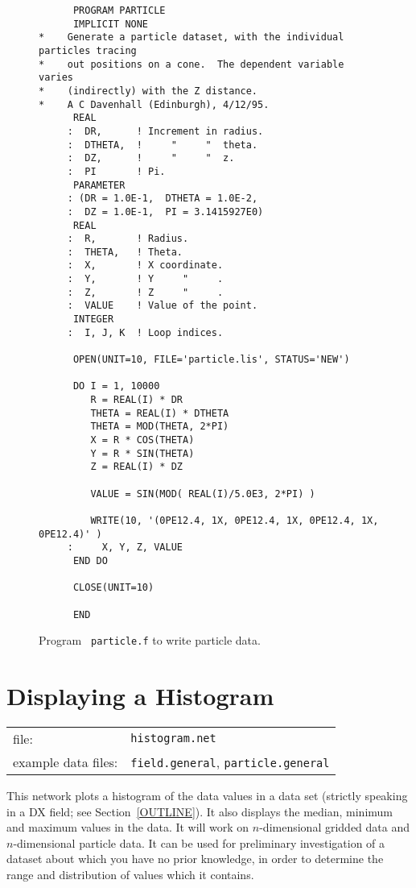 \begin{figure}[htbp]

\begin{verbatim}
      PROGRAM PARTICLE
      IMPLICIT NONE
*    Generate a particle dataset, with the individual particles tracing
*    out positions on a cone.  The dependent variable varies
*    (indirectly) with the Z distance.
*    A C Davenhall (Edinburgh), 4/12/95.
      REAL
     :  DR,      ! Increment in radius.
     :  DTHETA,  !     "     "  theta.
     :  DZ,      !     "     "  z.
     :  PI       ! Pi.
      PARAMETER
     : (DR = 1.0E-1,  DTHETA = 1.0E-2, 
     :  DZ = 1.0E-1,  PI = 3.1415927E0)
      REAL
     :  R,       ! Radius.
     :  THETA,   ! Theta.
     :  X,       ! X coordinate.
     :  Y,       ! Y     "     .
     :  Z,       ! Z     "     .
     :  VALUE    ! Value of the point.
      INTEGER
     :  I, J, K  ! Loop indices.

      OPEN(UNIT=10, FILE='particle.lis', STATUS='NEW')

      DO I = 1, 10000
         R = REAL(I) * DR
         THETA = REAL(I) * DTHETA
         THETA = MOD(THETA, 2*PI)
         X = R * COS(THETA)
         Y = R * SIN(THETA)
         Z = REAL(I) * DZ

         VALUE = SIN(MOD( REAL(I)/5.0E3, 2*PI) )

         WRITE(10, '(0PE12.4, 1X, 0PE12.4, 1X, 0PE12.4, 1X, 0PE12.4)' )
     :     X, Y, Z, VALUE
      END DO

      CLOSE(UNIT=10)

      END
\end{verbatim}

\caption[Program {\tt particle.f} to write particle data.]{Program {\tt
particle.f} to write particle data. \label{PARTICLE.F} }

\end{figure}


\newpage
\section{\label{HISTNET}Displaying a Histogram}


\begin{tabular}{ll}
file:               & {\tt histogram.net} \\
example data files: & {\tt field.general}, {\tt particle.general} \\
\end{tabular}

This network plots a histogram of the data values in a data set (strictly
speaking in a DX field; see Section~\ref{OUTLINE}). It also displays the
median, minimum and maximum values in the data. It will work on
$n$-dimensional gridded data and $n$-dimensional particle data. It can be
used for preliminary investigation of a dataset about which you have no
prior knowledge, in order to determine the range and distribution of
values which it contains.

